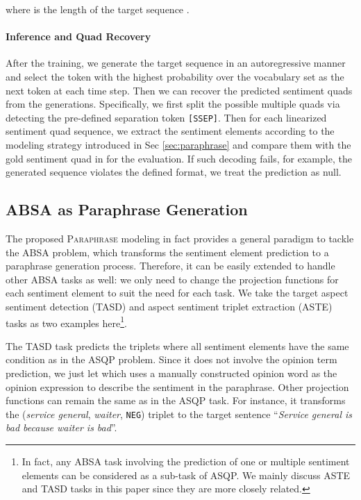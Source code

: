 \documentclass[11pt]{article}
\begin{document}
where  is the length of the target sequence .

\paragraph{Inference and Quad Recovery}
After the training, we generate the target sequence  in an autoregressive manner and select the token with the highest probability over the vocabulary set as the next token at each time step.
Then we can recover the predicted sentiment quads  from the generations. Specifically, we first split the possible multiple quads via detecting the pre-defined separation token \texttt{[SSEP]}. Then for each linearized sentiment quad sequence, we extract the sentiment elements according to the modeling strategy introduced in Sec \ref{sec:paraphrase} and compare them with the gold sentiment quad in  for the evaluation.
If such decoding fails, for example, the generated sequence violates the defined format, we treat the prediction as null.


\subsection{ABSA as Paraphrase Generation} \label{sec:absa-para}

The proposed \textsc{Paraphrase} modeling in fact provides a general paradigm to tackle the ABSA problem, which transforms the sentiment element prediction to a paraphrase generation process. Therefore, it can be easily extended to handle other ABSA tasks as well: we only need to change the projection functions for each sentiment element to suit the need for each task. We take the target aspect sentiment detection (TASD) \cite{aaai20-tasd} and aspect sentiment triplet extraction (ASTE) \cite{aaai20-robin} tasks as two examples here\footnote{In fact, any ABSA task involving the prediction of one or multiple sentiment elements can be considered as a sub-task of ASQP. We mainly discuss ASTE and TASD tasks in this paper since they are more closely related.}.

The TASD task predicts the  triplets where all sentiment elements have the same condition as in the ASQP problem. Since it does not involve the opinion term prediction, we just let  which uses a manually constructed opinion word as the opinion expression to describe the sentiment in the paraphrase. Other projection functions can remain the same as in the ASQP task. For instance, it transforms the (\textit{service general}, \textit{waiter}, \texttt{NEG}) triplet to the target sentence ``\textit{Service general is bad because waiter is bad}''.
\end{document}
